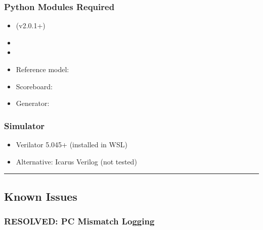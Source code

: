 \subsubsection{Python Modules Required}\label{cr:status:random-tests-status:python-modules-required}

\begin{record}

\begin{itemize}
\tightlist
\item
   (v2.0.1+)
\item
\item
\item
  Reference model: 
\item
  Scoreboard: 
\item
  Generator: 
\end{itemize}

\end{record}

\subsubsection{Simulator}\label{cr:status:random-tests-status:simulator}

\begin{record}

\begin{itemize}
\tightlist
\item
  Verilator 5.045+ (installed in WSL)
\item
  Alternative: Icarus Verilog (not tested)
\end{itemize}

\begin{center}\rule{0.5\linewidth}{0.5pt}\end{center}

\end{record}

\subsection{Known Issues}\label{cr:status:random-tests-status:known-issues}

\subsubsection{\texorpdfstring{\ok{} RESOLVED: PC Mismatch
Logging}{ RESOLVED: PC Mismatch Logging}}\label{cr:status:random-tests-status:white-check-mark-resolved-pc-mismatch-logging}

